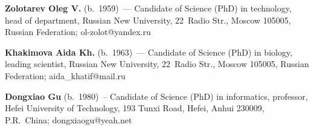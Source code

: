 \vspace*{3pt}

\noindent
\textbf{Zolotarev Oleg V.} (b.\ 1959)~--- Candidate of Science (PhD) in technology, head of  
department, Russian New University, 22~Radio Str., Moscow 105005, Russian Federation;  
\mbox{ol-zolot@yandex.ru}

\vspace*{3pt}

\noindent
\textbf{Khakimova Aida Kh.} (b.\ 1963)~--- Candidate of Science (PhD) in biology, leading scientist, 
Russian New University, 22~Radio Str., Moscow 105005, Russian Federation; 
\mbox{aida\_khatif@mail.ru}

\vspace*{3pt}

\noindent
\textbf{Dongxiao Gu} (b.\ 1980)~-- Candidate of Science (PhD) in informatics, professor, Hefei University of Technology, 193 
Tunxi Road, Hefei, Anhui 230009, P.R.\ China; \mbox{dongxiaogu@yeah.net}

     
\label{end\stat}

\renewcommand{\bibname}{\protect\rm Литература}  